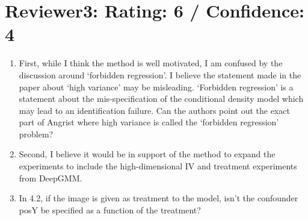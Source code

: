 \documentclass{article}
\begin{document}
\section{Reviewer3: Rating: 6 / Confidence: 4}
\begin{enumerate}
    \item First, while I think the method is well motivated, I am confused by the discussion around `forbidden regression'. I believe the statement made in the paper about `high variance' may be misleading. `Forbidden regression' is a statement about the mis-specification of the conditional density model which may lead to an identification failure. Can the authors point out the exact part of Angrist where high variance is called the `forbidden regression' problem?


\item Second, I believe it would be in support of the method to expand the experiments to include the high-dimensional IV and treatment experiments from DeepGMM.



\item In 4.2, if the image is given as treatment to the model, isn't the confounder posY be specified as a function of the treatment?



\end{enumerate}
\end{document}
